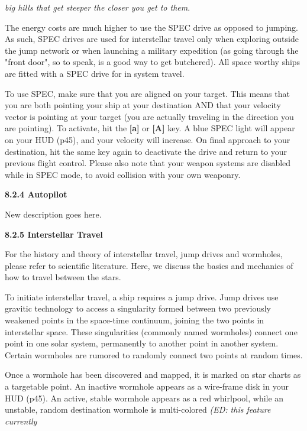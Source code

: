 \documentclass{article}
\begin{document}
\textit{big hills that get steeper the closer you get to them}. 

The energy costs are much higher to use the SPEC drive as opposed to jumping. As such, SPEC drives are used for interstellar travel only when exploring outside the jump network or when launching a military expedition (as going through the "front door", so to speak, is a good way to get butchered). All space worthy ships are fitted with a SPEC drive for in system travel. 

To use SPEC, make sure that you are aligned on your target. This means that you are both pointing your ship at your destination AND that your velocity vector is pointing at your target (you are actually traveling in the direction you are pointing). To activate, hit the \textbf{[a] }or \textbf{[A] }key. A blue SPEC light will appear on your HUD (p45), and your velocity will increase. On final approach to your destination, hit the same key again to deactivate the drive and return to your previous flight control.  Please also note that your weapon systems are disabled while in SPEC mode, to avoid collision with your own weaponry. 

\textbf{8.2.4 Autopilot }

 New description goes here.















\textbf{8.2.5 Interstellar Travel }

For the history and theory of interstellar travel, jump drives and wormholes, please refer to scientific literature. Here, we discuss the basics and mechanics of how to travel between the stars. 

To initiate interstellar travel, a ship requires a jump drive. Jump drives use gravitic technology to access a singularity formed between two previously weakened points in the space-time continuum, joining the two points in interstellar space. These singularities (commonly named wormholes) connect one point in one solar system, permanently to another point in another system. Certain wormholes are rumored to randomly connect two points at random times. 

Once a wormhole has been discovered and mapped, it is marked on star charts as a targetable point. An inactive wormhole appears as a wire-frame disk in your HUD (p45). An active, stable wormhole appears as a red whirlpool, while an unstable, random destination wormhole is multi-colored \textit{(ED: this feature currently }
\end{document}
